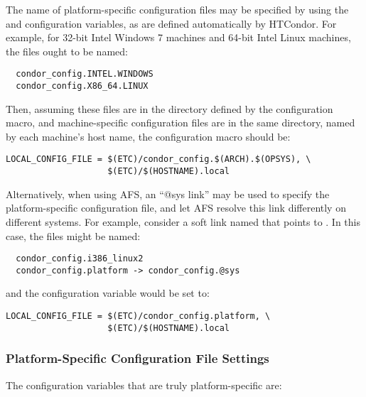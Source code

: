 The name of 
platform-specific configuration files may be specified by using the
 and  configuration variables, as are defined
automatically by HTCondor.
For example, for 32-bit Intel Windows 7
machines and 64-bit Intel Linux machines,
the files ought to be named:

\begin{verbatim}
  condor_config.INTEL.WINDOWS
  condor_config.X86_64.LINUX
\end{verbatim}

Then, assuming these files are in the directory defined by the
 configuration macro,
and machine-specific configuration files are in
the same directory, named by each machine's host name, the
 configuration macro should be:

\footnotesize
\begin{verbatim}
LOCAL_CONFIG_FILE = $(ETC)/condor_config.$(ARCH).$(OPSYS), \
                    $(ETC)/$(HOSTNAME).local
\end{verbatim}
\normalsize

Alternatively, when using AFS, an ``@sys link'' may be used to
specify the platform-specific configuration file,
and let AFS resolve this link differently on different systems.
For example, consider
a soft link named  that points to
.  In this case, the files might be named:

\begin{verbatim}
  condor_config.i386_linux2
  condor_config.platform -> condor_config.@sys
\end{verbatim}

and the  configuration variable would be set to:

\footnotesize
\begin{verbatim}
LOCAL_CONFIG_FILE = $(ETC)/condor_config.platform, \
                    $(ETC)/$(HOSTNAME).local
\end{verbatim}
\normalsize

\subsubsection{\label{sec:Platform-Specific-Settings}Platform-Specific
Configuration File Settings}

The configuration variables that are truly platform-specific are:

